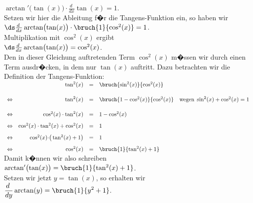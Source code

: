 \begin{enumerate}
      \hspace*{1.3cm}
      $\arctan'\bigl(\tan(x)\bigr) \cdot \frac{d\;}{dx} \tan(x) = 1$.
      \\[0.3cm]
      Setzen wir hier die Ableitung f�r die Tangens-Funktion ein, so haben wir
      \\[0.3cm]
      \hspace*{1.3cm}
      $\ds \frac{d\;}{dx} \arctan\bigl(\tan(x)\bigr) \cdot \bruch{1}{\cos^2(x)} = 1$.
      \\[0.3cm]
      Multiplikation mit $\cos^2(x)$ ergibt
      \\[0.3cm]
      \hspace*{1.3cm}
      $\ds \frac{d\;}{dx} \arctan\bigl(\tan(x)\bigr) = \cos^2(x)$.
      \\[0.3cm]
      Den in dieser  Gleichung auftretenden Term $\cos^2(x)$ m�ssen wir durch einen Term ausdr�cken, in dem
      nur $\tan(x)$ auftritt.  Dazu betrachten wir die Definition der Tangens-Funktion:      
      \\[0.3cm]
      \hspace*{1.3cm}
      $
      \begin{array}[t]{lrcll}
                & \tan^2(x) & = & \bruch{\sin^2(x)}{\cos^2(x)} \\[0.5cm] 
\Leftrightarrow & \tan^2(x) & = & \bruch{1 - \cos^2(x)}{\cos^2(x)} & \mbox{wegen}\; \sin^2(x) + \cos^2(x) = 1 \\[0.5cm] 
\Leftrightarrow & \cos^2(x) \cdot \tan^2(x) & = & 1 - \cos^2(x) &  \\[0.3cm] 
\Leftrightarrow & \cos^2(x) \cdot \tan^2(x) + \cos^2(x) & = & 1  &  \\[0.3cm] 
\Leftrightarrow & \cos^2(x) \cdot \bigr(\tan^2(x) + 1\bigr) & = & 1  &  \\[0.3cm] 
\Leftrightarrow & \cos^2(x)  & = &  \bruch{1}{\tan^2(x) + 1} &  
      \end{array}
      $
      \\[0.3cm]
      Damit k�nnen wir also schreiben 
      \\[0.3cm]
      \hspace*{1.3cm}
      $\arctan'\bigl(\tan(x)\bigr) = \bruch{1}{\tan^2(x) + 1}$.
      \\[0.3cm]
      Setzen wir jetzt $y = \tan(x)$, so erhalten wir 
      \\[0.3cm]
      \hspace*{1.3cm}
      $\displaystyle\frac{d\;}{dy} \arctan(y) = \bruch{1}{y^2 + 1}$.
\end{enumerate}

